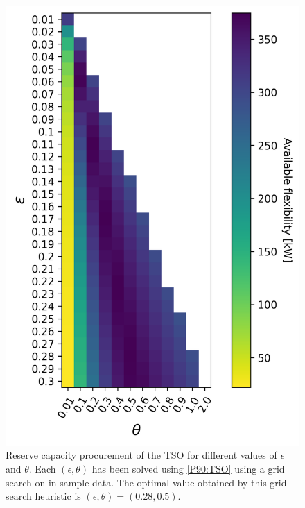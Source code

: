 \documentclass[conference]{IEEEtran}
\begin{document}
\begin{figure}[!t]
    \centering
    \includegraphics[width=0.95\columnwidth]{../figures/heatmap.png}
    \caption{\small{Reserve capacity procurement of the \ac{TSO} for different values of $\epsilon$ and $\theta$. Each $(\epsilon, \theta)$ has been solved using \eqref{P90:TSO} using a grid search on in-sample data. The optimal value obtained by this grid search heuristic is $(\epsilon, \theta) = (0.28, 0.5)$. }}
    \label{fig:tso}
\end{figure}


\vspace{2mm}
\end{document}
